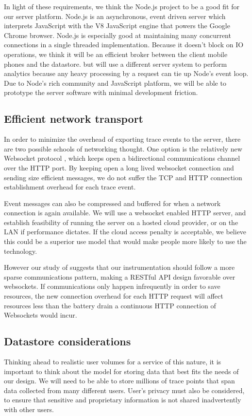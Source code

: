 \documentclass{acm_proc_article-sp}
\begin{document}
In light of these requirements, we think the Node.js \cite{node}
project to be a good fit for our server platform.
Node.js is an asynchronous, event driven server 
which interprets JavaScript with the V8 JavaScript engine \cite{V8-javascript} that
powers the Google Chrome browser. Node.js is especially good
at maintaining many concurrent connections in a single threaded implementation.
Because it doesn't block on IO operations, we think it will be an efficient broker
between the client mobile phones and the datastore. but will use a different server
system to perform analytics
because any heavy processing by a request can tie up Node's event loop.
Due to Node's rich community and JavaScript platform,
we will be able to prototype the server software with minimal development friction.

\subsection{Efficient network transport}
In order to minimize the overhead of exporting trace 
events to the server, there are two possible schools of networking thought.
One option is the relatively new Websocket protocol 
\cite{WebsocketRFC}, which keeps open a bidirectional communications channel 
over the HTTP port. By keeping open a long lived 
websocket connection and sending size efficient 
messages, we do not suffer the TCP and HTTP connection establishment overhead 
for each trace event. 

Event messages can also be compressed and buffered for when a 
network connection is again available. We will use a websocket enabled HTTP 
server, and establish feasibility of running the server on a hosted cloud 
provider, or on the LAN if performance dictates. If the cloud access penalty is 
acceptable, we believe this could be a superior use model that would make people
more likely to use the technology. 

However our study of \cite{PeriodicTransfers} suggests that
our instrumentation should follow a more sparse communications pattern, making
a RESTful API\cite{REST} design favorable over websockets. If communications
only happen infrequently in order to save resources, the new connection overhead for
each HTTP request will affect resources less than the battery
drain a continuous HTTP connection of Websockets would incur.

\subsection{Datastore considerations}
Thinking ahead to realistic user volumes for a service of this nature, it is
important to think about the model for storing data that best fits the 
needs of our design. We will need to be able to store millions of trace points
that span data collected from many different users. User's privacy must also be
considered, to ensure that sensitive and proprietary information is not shared
inadvertently with other users.
\end{document}
